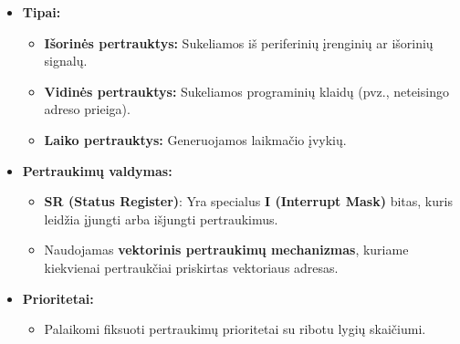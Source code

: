 \documentclass{article}
\begin{document}
\begin{itemize}
    \item \textbf{Tipai:}
        \begin{itemize}
            \item \textbf{Išorinės pertrauktys:} Sukeliamos iš periferinių įrenginių ar išorinių signalų.
            \item \textbf{Vidinės pertrauktys:} Sukeliamos programinių klaidų (pvz., neteisingo adreso prieiga).
            \item \textbf{Laiko pertrauktys:} Generuojamos laikmačio įvykių.
        \end{itemize}
    \item \textbf{Pertraukimų valdymas:}
        \begin{itemize}
            \item \textbf{SR (Status Register)}: Yra specialus \textbf{I (Interrupt Mask)} bitas, kuris leidžia įjungti arba išjungti pertraukimus.
            \item Naudojamas \textbf{vektorinis pertraukimų mechanizmas}, kuriame kiekvienai pertraukčiai priskirtas vektoriaus adresas.
        \end{itemize}
    \item \textbf{Prioritetai:}
        \begin{itemize}
            \item Palaikomi fiksuoti pertraukimų prioritetai su ribotu lygių skaičiumi.
        \end{itemize}
\end{itemize}
\end{document}
